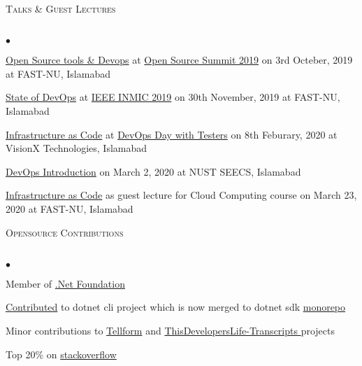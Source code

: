\documentclass{article}
\newcommand{\lineunder}{\vspace*{-8pt} \\ \hspace*{-18pt} \hrulefill \\}
\newcommand{\header}[1]{{\hspace*{-15pt}\vspace*{6pt} \textsc{#1}} \vspace*{-6pt} \lineunder}
\newenvironment{achievements}{\begin{list}{$\bullet$}{\topsep 0pt \itemsep -2pt}}{\vspace*{4pt}\end{list}}
\begin{document}
\header{Talks \& Guest Lectures}
\begin{achievements}
\item
  \href{https://docs.google.com/presentation/d/1-moX3IvT8Ocrd4TDj8U76YCVTLhnvIooRV43PlslE6Q/edit?usp=sharing}{Open
  Source tools \& Devops} at
  \href{https://osfp.org.pk/page/homepage}{Open Source Summit 2019} on
  3rd Octeber, 2019 at FAST-NU, Islamabad
\item
  \href{https://docs.google.com/presentation/d/1PJMvFE-pQgFTW1SK5j9GxF9rVl3UIvvuFJaWmLvlE7Y/edit?usp=sharing}{State
  of DevOps} at
  \href{http://www.inmic.org.pk/Program/CompleteProgram.html}{IEEE INMIC
  2019} on 30th November, 2019 at FAST-NU, Islamabad
\item
  \href{https://docs.google.com/presentation/d/1uAh7D58lhLyDQfgcTfbdqgATQ0oq7zvZiaFbUGB1TLo/edit?usp=sharing}{Infrastructure
  as Code} at
  \href{https://www.facebook.com/events/166629501414148/}{DevOps Day
  with Testers} on 8th Feburary, 2020 at VisionX Technologies, Islamabad
\item
  \href{https://docs.google.com/presentation/d/1IoV68le3qeLUqXvrt8rwRueWpAWQ-Z_vxcbhycprFoY/edit?usp=sharing}{DevOps
  Introduction} on March 2, 2020 at NUST SEECS, Islamabad
\item
  \href{https://docs.google.com/presentation/d/10SGHkKEapM0bm9I-eQvae8vKA08LUj_QLH6LqvIu3bM/edit?usp=sharing}{Infrastructure
  as Code} as guest lecture for Cloud Computing course on March 23, 2020
  at FAST-NU, Islamabad
\end{achievements}

\header{Opensource Contributions}
\begin{achievements}
\item
  Member of \href{https://dotnetfoundation.org/}{.Net Foundation}
\item
  \href{https://github.com/dotnet/cli/pull/10914}{Contributed} to dotnet cli project which is now merged to dotnet sdk \href{https://github.com/dotnet/sdk}{monorepo}
\item
  Minor contributions to \href{https://github.com/tellform/tellform}{Tellform} and \href{https://github.com/shanselman/ThisDevelopersLife-Transcripts/pull/36}{ThisDevelopersLife-Transcripts
} projects
\item
  Top 20\% on \href{https://stackoverflow.com/users/713683/luqi}{stackoverflow} 
\end{achievements}
\end{document}

